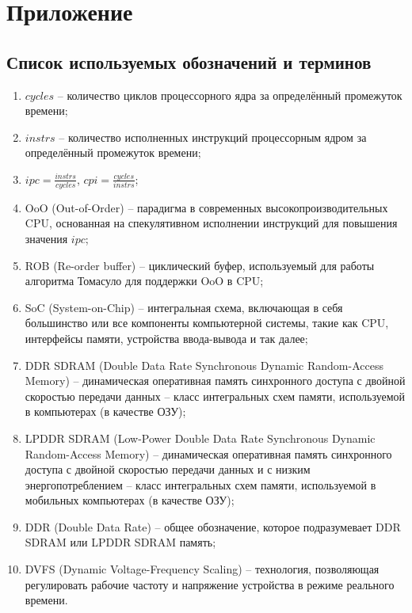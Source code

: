 \section*{Приложение}
\label{sec:Apendix} 

\subsection*{Список используемых обозначений и терминов}

\begin{enumerate}
    \item $cycles$ -- количество циклов процессорного ядра за определённый промежуток времени;
    \item $instrs$ -- количество исполненных инструкций процессорным ядром за определённый
        промежуток времени;
    \item $ipc = \frac{instrs}{cycles}$, $cpi = \frac{cycles}{instrs}$;
    \item OoO (Out-of-Order) -- парадигма в современных высокопроизводительных CPU, основанная
        на спекулятивном исполнении инструкций для повышения значения $ipc$;
    \item ROB (Re-order buffer) -- циклический буфер, используемый для работы алгоритма Томасуло
        для поддержки OoO в CPU;
    \item SoC (System-on-Chip) -- интегральная схема, включающая в себя большинство или все
        компоненты компьютерной системы, такие как CPU, интерфейсы памяти, устройства ввода-вывода
        и так далее;
    \item DDR SDRAM (Double Data Rate Synchronous Dynamic Random-Access Memory) --
        динамическая оперативная память синхронного доступа с двойной скоростью передачи данных --
        класс интегральных схем памяти, используемой в
        компьютерах (в качестве ОЗУ);
    \item LPDDR SDRAM (Low-Power Double Data Rate Synchronous Dynamic Random-Access Memory) --
        динамическая оперативная память синхронного доступа с двойной скоростью передачи данных и
        с низким энергопотреблением -- класс интегральных схем памяти, используемой в
        мобильных компьютерах (в качестве ОЗУ);
    \item DDR (Double Data Rate) -- общее обозначение, которое подразумевает DDR SDRAM или
        LPDDR SDRAM память;
    \item DVFS (Dynamic Voltage-Frequency Scaling) -- технология, позволяющая регулировать
        рабочие частоту и напряжение устройства в режиме реального времени.



\end{enumerate}
